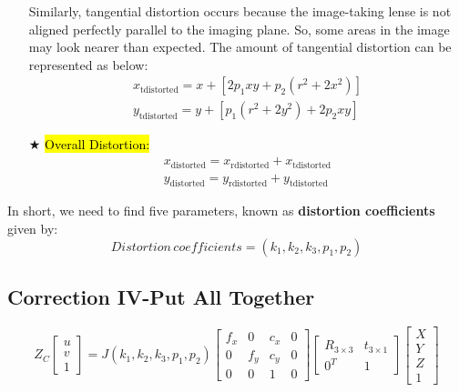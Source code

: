 \documentclass{article}
\begin{document}
\begin{itemize}
	Similarly, tangential distortion occurs because the image-taking lense is not aligned perfectly parallel to the imaging plane. So, some areas in the image may look nearer than expected. The amount of tangential distortion can be represented as below:
		\begin{equation}
		\begin{array}{l}
		x_{\text {tdistorted}}=x + \left[2p_{1}xy+p_{2}(r^2+2x^2)\right] \\
		y_{\text {tdistorted}}=y + \left[p_{1}(r^2+2y^2)+2p_{2}xy\right]
		\end{array}
		\label{Eq_tangential_distortion}
		\end{equation}
	
	\item [$\bigstar$] \hl{Overall Distortion:}
		\begin{equation}
		\begin{array}{l}
		x_{\text {distorted}}=x_{\text {rdistorted}} + x_{\text {tdistorted}} \\
		y_{\text {distorted}}=y_{\text {rdistorted}} + y_{\text {tdistorted}}
		\end{array}
		\label{Eq_overall_distortion}
		\end{equation}
\end{itemize}

In short, we need to find five parameters, known as \textbf{distortion coefficients} given by:
\begin{equation}
	Distortion\,coefficients=(k_1, k_2, k_3, p_1, p_2)
	\label{Eq_distortion_coeff}
\end{equation}


\subsection{Correction IV-Put All Together}
\label{ssec:Correction4_math}
\begin{equation}
Z_C \left[\begin{array}{l}
u \\
v \\
1
\end{array}\right] = J(k_1,k_2,k_3,p_1,p_2) \left[\begin{array}{llll}
f_{x} & 0 & c_{x} &0\\
0 & f_{y} & c_{y} &0\\
0 & 0 & 1  &0
\end{array}\right]\left[\begin{array}{ll}
R_{3\times 3} & t_{3\times 1} \\
0^T & 1 
\end{array}\right]\left[\begin{array}{l}
X \\
Y \\
Z \\
1
\end{array}\right] 			
\label{Eq_Pixel2World_AllTogether}
\end{equation}
\end{document}

